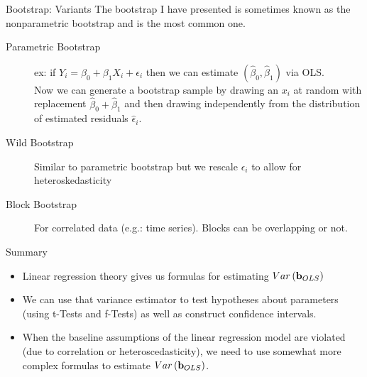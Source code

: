 \begin{frame}{Bootstrap: Variants}
The bootstrap I have presented is sometimes known as the \alert{nonparametric bootstrap} and is the most common one.
\begin{description}
\item[Parametric Bootstrap] ex: if $Y_i = \beta_0 + \beta_1 X_i + \epsilon_i$ then we can estimate $(\hat{\beta}_0,\hat{\beta}_1)$ via OLS.\\
 Now we can generate a bootstrap sample by drawing an $x_i$ at random with replacement $\hat{\beta}_0 + \hat{\beta}_1$ and then drawing \alert{independently} from the distribution of estimated residuals $\hat{\epsilon}_i$.
 \item[Wild Bootstrap] Similar to parametric bootstrap but we rescale $\epsilon_i$ to allow for \alert{heteroskedasticity}
\item[Block Bootstrap] For correlated data (e.g.: time series). Blocks can be overlapping or not.  
\end{description}
\end{frame}


\begin{frame}{Summary}
\begin{itemize}
	\item Linear regression theory gives us formulas for estimating $Var\left({\bf b}_{OLS}\right)$

	\item We can use that variance estimator to test hypotheses about parameters (using t-Tests
	and f-Tests) as well as construct confidence intervals. 

	\item When the baseline assumptions of the linear regression model are violated (due to
	correlation or heteroscedasticity), we need to use somewhat more complex formulas
	to estimate  $Var\left({\bf b}_{OLS}\right)$.

\end{itemize}
\end{frame}



